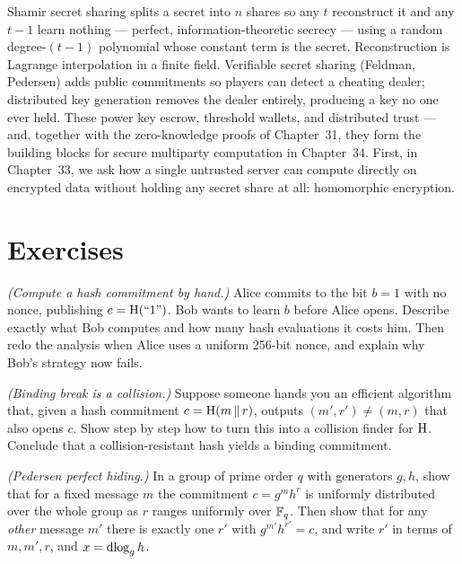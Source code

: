 Shamir secret sharing splits a secret into $n$ shares so any $t$ reconstruct it and any $t-1$ learn nothing --- perfect, information-theoretic secrecy --- using a random degree-$(t-1)$ polynomial whose constant term is the secret. Reconstruction is Lagrange interpolation in a finite field. Verifiable secret sharing (Feldman, Pedersen) adds public commitments so players can detect a cheating dealer; distributed key generation removes the dealer entirely, producing a key no one ever held. These power key escrow, threshold wallets, and distributed trust --- and, together with the zero-knowledge proofs of Chapter~31, they form the building blocks for secure multiparty computation in Chapter~34. First, in Chapter~33, we ask how a single untrusted server can compute directly on encrypted data without holding any secret share at all: homomorphic encryption.

\section{Exercises}
\label{ch32:exercises}

\begin{exercise}
\emph{(Compute a hash commitment by hand.)} Alice commits to the bit $b = 1$ with no nonce, publishing $c = \operatorname{H}(\text{``1''})$. Bob wants to learn $b$ before Alice opens. Describe exactly what Bob computes and how many hash evaluations it costs him. Then redo the analysis when Alice uses a uniform 256-bit nonce, and explain why Bob's strategy now fails.
\end{exercise}

\begin{exercise}
\emph{(Binding break is a collision.)} Suppose someone hands you an efficient algorithm that, given a hash commitment $c = \operatorname{H}(m\,\|\, r)$, outputs $(m',r') \ne (m,r)$ that also opens $c$. Show step by step how to turn this into a collision finder for $\operatorname{H}$. Conclude that a collision-resistant hash yields a binding commitment.
\end{exercise}

\begin{exercise}
\emph{(Pedersen perfect hiding.)} In a group of prime order $q$ with generators $g,h$, show that for a fixed message $m$ the commitment $c = g^m h^r$ is uniformly distributed over the whole group as $r$ ranges uniformly over $\mathbb{F}_q$. Then show that for any \emph{other} message $m'$ there is exactly one $r'$ with $g^{m'}h^{r'} = c$, and write $r'$ in terms of $m, m', r$, and $x = \operatorname{dlog}_g h$.
\end{exercise}

